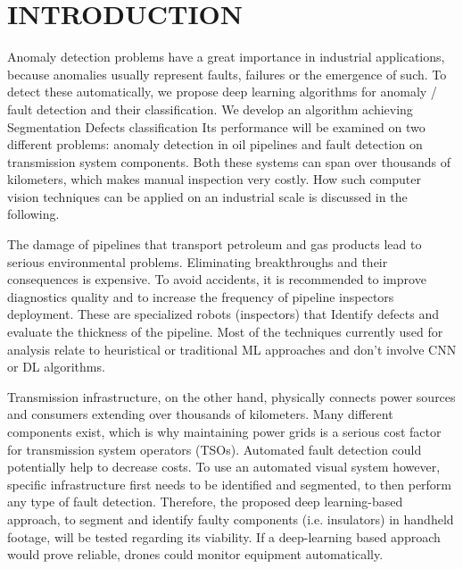 \section{INTRODUCTION}
\label{INTRODUCTION}

Anomaly detection problems have a great importance in industrial applications, because anomalies usually represent faults, failures or the emergence of such. To detect these automatically, we propose deep learning algorithms for anomaly / fault detection and their classification. We develop an algorithm achieving Segmentation Defects classification Its performance will be examined on two different problems: anomaly detection in oil pipelines and fault detection on transmission system components. Both these systems can span over thousands of kilometers, which makes manual inspection very costly. How such computer vision techniques can be applied on an industrial scale is discussed in the following.

The damage of pipelines that transport petroleum and gas products lead to serious environmental problems. Eliminating breakthroughs and their consequences is expensive. To avoid accidents, it is recommended to improve diagnostics quality and to increase the frequency of pipeline inspectors deployment. These are specialized robots (inspectors) that Identify defects and evaluate the thickness of the pipeline. Most of the techniques currently used for analysis relate to heuristical or traditional ML approaches and don’t involve CNN or DL algorithms.

Transmission infrastructure, on the other hand, physically connects power sources and consumers extending over thousands of kilometers. Many different components exist, which is why maintaining power grids is a serious cost factor for transmission system operators (TSOs). Automated fault detection could potentially help to decrease costs. To use an automated visual system however, specific infrastructure first needs to be identified and segmented, to then perform any type of fault detection. Therefore, the proposed deep learning-based approach, to segment and identify faulty components (i.e. insulators) in handheld footage, will be tested regarding its viability. If a deep-learning based approach would prove reliable, drones could monitor equipment automatically.
